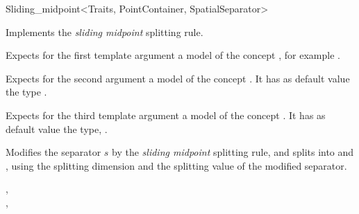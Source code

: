 

\begin{ccRefFunctionObjectClass}{Sliding_midpoint<Traits, PointContainer, SpatialSeparator>}


\ccDefinition
Implements the {\em sliding midpoint} splitting rule.


\ccParameters

Expects for the first template argument a model of the concept
, for example .

Expects for the second argument a model of the concept . It has as default value
the type .

Expects for the third template argument a model of the concept . It has as default value
the type, .


\ccIsModel


\ccTypes



\ccOperations

{Modifies the separator $s$ by the {\em sliding midpoint} splitting rule, 
and splits  into  and ,
using the splitting dimension and the splitting value of the modified separator.
}

\ccSeeAlso

,\\
 ,\\
\end{ccRefFunctionObjectClass}


